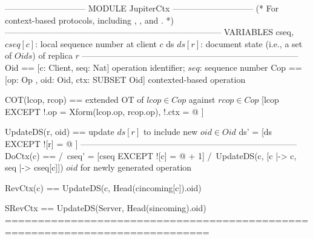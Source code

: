 \documentclass{article}
\begin{document}
\begin{tla}
----------------------------- MODULE JupiterCtx -----------------------------
(*
For context-based \jupiter{} protocols, including \absjupiter{}, \cjupiter{}, and \xjupiter{}.
*)
-----------------------------------------------------------------------------
VARIABLES 
    cseq,  \* $cseq[c]$: local sequence number at client $c$
    ds     \* $ds[r]$: document state (i.e., a set of $Oids$) of replica $r$
-----------------------------------------------------------------------------
Oid == [c: Client, seq: Nat] \* operation identifier; $seq$: sequence number
Cop == [op: Op , oid: Oid, ctx: SUBSET Oid] \* contexted-based operation

COT(lcop, rcop) == \* extended OT of $lcop \in Cop$ against $rcop \in Cop$
    [lcop EXCEPT !.op = Xform(lcop.op, rcop.op), !.ctx = @ ]

UpdateDS(r, oid) == \* update $ds[r]$ to include new $oid \in Oid$
    ds' = [ds EXCEPT ![r] = @ ]
-----------------------------------------------------------------------------
DoCtx(c) == 
    /\ cseq' = [cseq EXCEPT ![c] = @ + 1]
    /\ UpdateDS(c, [c |-> c, seq |-> cseq[c]]) \* $oid$ for newly generated operation

RevCtx(c) == UpdateDS(c, Head(cincoming[c]).oid)
    
SRevCtx == UpdateDS(Server, Head(sincoming).oid)
=============================================================================
\end{tla}
\end{document}
